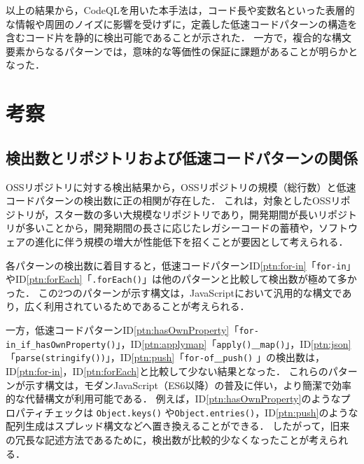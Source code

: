 \documentclass[11pt]{jreport}
\begin{document}
以上の結果から，CodeQLを用いた本手法は，コード長や変数名といった表層的な情報や周囲のノイズに影響を受けずに，定義した低速コードパターンの構造を含むコード片を静的に検出可能であることが示された．
一方で，複合的な構文要素からなるパターンでは，意味的な等価性の保証に課題があることが明らかとなった．


\chapter{考察}
\label{chap:consideration}

\section{検出数とリポジトリおよび低速コードパターンの関係}

OSSリポジトリに対する検出結果から，OSSリポジトリの規模（総行数）と低速コードパターンの検出数に正の相関が存在した．
これは，対象としたOSSリポジトリが，スター数の多い大規模なリポジトリであり，開発期間が長いリポジトリが多いことから，開発期間の長さに応じたレガシーコードの蓄積や，ソフトウェアの進化に伴う規模の増大が性能低下を招く\cite{emprical_perfomancebug}ことが要因として考えられる．

各パターンの検出数に着目すると，低速コードパターンID\ref{ptn:for-in}「\texttt{for-in}」やID\ref{ptn:forEach}「\texttt{.forEach()}」は他のパターンと比較して検出数が極めて多かった．
この2つのパターンが示す構文は，JavaScriptにおいて汎用的な構文であり，広く利用されているためであることが考えられる．

一方，低速コードパターンID\ref{ptn:hasOwnProperty}「\texttt{for-in\_if\_hasOwnProperty()}」，ID\ref{ptn:applymap}「\texttt{apply()}\textbf{\_}\texttt{map()}」，ID\ref{ptn:json}「\texttt{parse(stringify())}」，ID\ref{ptn:push}「\texttt{for-of}\textbf{\_}\texttt{push()} 」の検出数は，ID\ref{ptn:for-in}，ID\ref{ptn:forEach}と比較して少ない結果となった．
これらのパターンが示す構文は，モダンJavaScript（ES6以降）の普及に伴い，より簡潔で効率的な代替構文が利用可能である．
例えば，ID\ref{ptn:hasOwnProperty}のようなプロパティチェックは \texttt{Object.keys()} や\texttt{Object.entries()}，ID\ref{ptn:push}のような配列生成はスプレッド構文などへ置き換えることができる．
したがって，旧来の冗長な記述方法であるために，検出数が比較的少なくなったことが考えられる．

\end{document}
